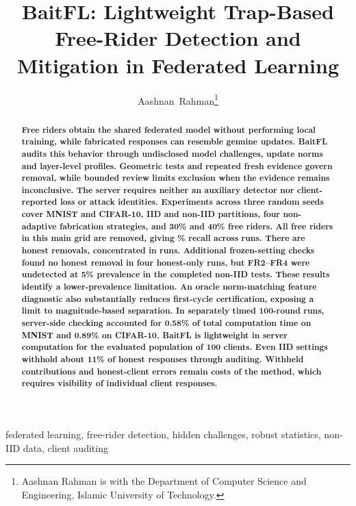 \documentclass[journal]{IEEEtran}
\title{BaitFL: Lightweight Trap-Based Free-Rider Detection and Mitigation in Federated Learning}
\author{Aashnan~Rahman\thanks{Aashnan Rahman is with the Department of Computer Science and Engineering, Islamic University of Technology.}}
\begin{document}
\maketitle
\raggedbottom
\setlength{\parskip}{0pt plus 2pt minus 0.5pt}
\makeatletter
\def\@textbottom{\vskip\z@ plus 6pt}
\makeatother
\setlength{\abovedisplayskip}{6pt plus 1pt minus 1pt}
\setlength{\belowdisplayskip}{6pt plus 1pt minus 1pt}
\setlength{\abovedisplayshortskip}{3pt plus 1pt minus 1pt}
\setlength{\belowdisplayshortskip}{3pt plus 1pt minus 1pt}

\begin{abstract}
\bfseries
Free riders obtain the shared federated model without performing local
training, while fabricated responses can resemble genuine updates.
BaitFL audits this behavior through undisclosed model challenges,
update norms and layer-level profiles. Geometric tests and repeated fresh
evidence govern removal, while bounded review limits exclusion when
the evidence remains inconclusive. The server requires neither an
auxiliary detector nor client-reported loss or attack identities.
Experiments across three random seeds cover MNIST and CIFAR-10, IID and
non-IID partitions, four non-adaptive fabrication strategies, and 30\%
and 40\% free riders. All free riders in this main grid are removed, giving
\MultiRecall\% recall across \ReviewRunCount{} runs. There are \MultiFP{}
honest removals, concentrated in \ReviewAffectedRuns{} runs. Additional
frozen-setting checks found no honest removal in four honest-only runs,
but FR2--FR4 were undetected at 5\% prevalence in the completed non-IID
tests. These results identify a lower-prevalence limitation. An oracle
norm-matching feature diagnostic also substantially reduces first-cycle
certification, exposing a limit to magnitude-based separation. In separately
timed 100-round runs, server-side checking accounted for 0.58\% of total
computation time on MNIST and 0.89\% on CIFAR-10.
BaitFL is lightweight in server computation
for the evaluated population of 100 clients. Even IID settings withhold
about 11\% of honest responses through auditing. Withheld contributions
and honest-client errors remain costs of the method, which requires
visibility of individual client responses.
\end{abstract}

\begin{IEEEkeywords}
federated learning, free-rider detection, hidden challenges, robust statistics,
non-IID data, client auditing
\end{IEEEkeywords}
\end{document}
